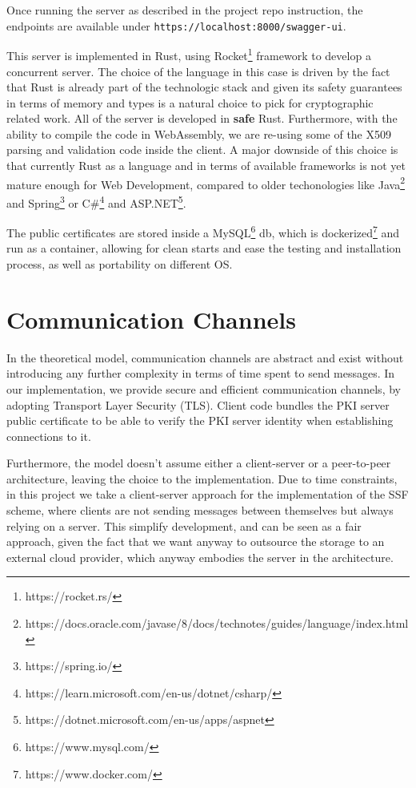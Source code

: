 Once running the server as described in the project repo instruction, the endpoints are available under \texttt{https://localhost:8000/swagger-ui}.

This server is implemented in Rust, using Rocket\footnote{https://rocket.rs/} framework to develop a concurrent server.
The choice of the language in this case is driven by the fact that Rust is already part of the technologic stack and given its safety guarantees in terms of memory and types is a natural choice to pick for cryptographic related work.
All of the server is developed in \textbf{safe} Rust.
Furthermore, with the ability to compile the code in WebAssembly, we are re-using some of the X509 parsing and validation code inside the client.
A major downside of this choice is that currently Rust as a language and in terms of available frameworks is not yet mature enough for Web Development, compared to older techonologies like Java\footnote{https://docs.oracle.com/javase/8/docs/technotes/guides/language/index.html} and Spring\footnote{https://spring.io/} or C\#\footnote{https://learn.microsoft.com/en-us/dotnet/csharp/} and ASP.NET\footnote{https://dotnet.microsoft.com/en-us/apps/aspnet}.

The public certificates are stored inside a MySQL\footnote{https://www.mysql.com/} db, which is dockerized\footnote{https://www.docker.com/} and run as a container, allowing for clean starts and ease the testing and installation process, as well as portability on different OS.

\section{Communication Channels}

In the theoretical model, communication channels are abstract and exist without introducing any further complexity in terms of time spent to send messages.
In our implementation, we provide secure and efficient communication channels, by adopting Transport Layer Security (TLS).
Client code bundles the PKI server public certificate to be able to verify the PKI server identity when establishing connections to it.

Furthermore, the model doesn't assume either a client-server or a peer-to-peer architecture, leaving the choice to the implementation.
Due to time constraints, in this project we take a client-server approach for the implementation of the SSF scheme, where clients are not sending messages between themselves but always relying on a server.
This simplify development, and can be seen as a fair approach, given the fact that we want anyway to outsource the storage to an external cloud provider, which anyway embodies the server in the architecture.

